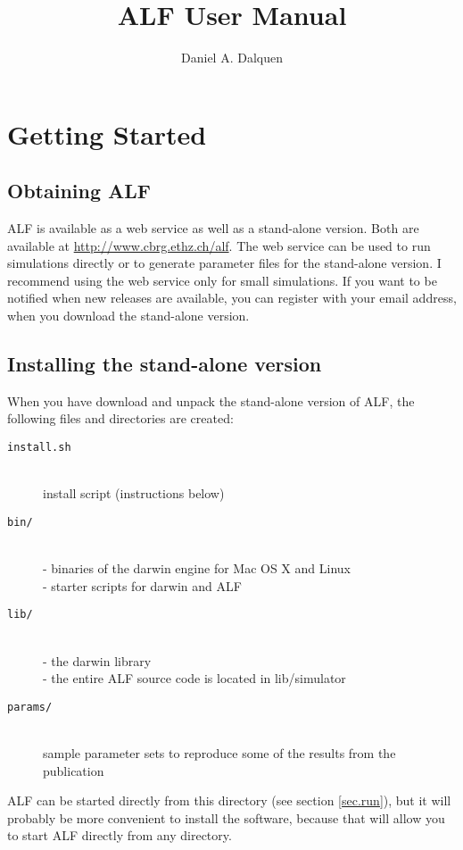 \documentclass[11pt]{article}
\begin{document}


\title{ALF User Manual}
\author{Daniel A. Dalquen}
\maketitle

\section{Getting Started}
\subsection{Obtaining ALF}
ALF is available as a web service as well as a stand-alone version. Both are available at \url{http://www.cbrg.ethz.ch/alf}. The web service can be used to run simulations directly or to generate parameter files for the stand-alone version. I recommend using the web service only for small simulations. If you want to be notified when new releases are available, you can register with your email address, when you download the stand-alone version.

\subsection{Installing the stand-alone version}
When you have download and unpack the stand-alone version of ALF, the following
files and directories are created:

\begin{description}
\item[\texttt{install.sh}] \hfill \\
install script (instructions below)
\item[\texttt{bin/}] \hfill \\
       - binaries of the darwin engine for Mac OS X and Linux\hfill \\
	   - starter scripts for darwin and ALF
\item[\texttt{lib/}] \hfill \\
       - the darwin library\hfill \\
	   - the entire ALF source code is located in lib/simulator
\item[\texttt{params/}] \hfill \\
sample parameter sets to reproduce some of the results from the publication
\end{description}

ALF can be started directly from this directory (see section \ref{sec.run}), but it will probably be more convenient to install the software, because that will allow you to start ALF directly from any directory.
\end{document}
